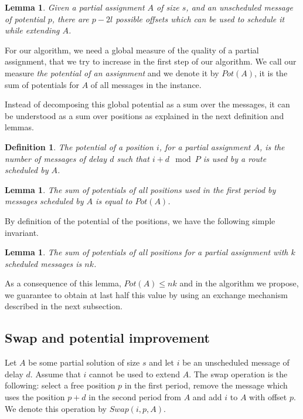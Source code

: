 \documentclass[10pt, conference, letterpaper]{IEEEtran}
\newtheorem{lemma}[theorem]{Lemma}
\newtheorem{definition}{Definition}
\begin{document}
\begin{lemma}
Given a partial assignment $A$ of size $s$, and an unscheduled message of potential 
$p$, there are $p - 2l$ possible offsets which can be used to schedule it while extending $A$.
\end{lemma}

For our algorithm, we need a global measure of the quality of a partial assignment, 
that we try to increase in the first step of our algorithm. 
We call our measure \emph{the potential of an assignment} and we denote it by $Pot(A)$, it is the sum of potentials for $A$ of all messages in the instance.

Instead of decomposing this global potential as a sum over the messages, it can be understood
as a sum over positions as explained in the next definition and lemmas.
 
\begin{definition}
The potential of a position $i$, for a partial assignment $A$, is the number of messages of delay $d$ such that $i+d \mod P$ is used by a route scheduled by $A$. 
\end{definition}

\begin{lemma}\label{lemma:pot_pos}
The sum of potentials of all positions used in the first period by messages scheduled by $A$ is equal to $Pot(A)$.  
\end{lemma}

By definition of the potential of the positions, we have the following simple invariant.

\begin{lemma}\label{lemma:inv}
The sum of potentials of all positions for a partial assignment with $k$ scheduled messages is $nk$.  
\end{lemma}

 As a consequence of this lemma, $Pot(A) \leq nk$ and in the algorithm we 
 propose, we guarantee to obtain at last half this value by using an exchange mechanism described in the next subsection.

\subsection{Swap and potential improvement}


Let $A$ be some partial solution of size $s$ and let $i$ be an unscheduled message of delay $d$. 
Assume that $i$ cannot be used to extend $A$. The swap operation is the following: 
select a free position $p$ in the first period, remove the message which uses the position $p+d$ in the second period from $A$ and add $i$ to $A$ with offset $p$. We denote this operation by $Swap(i,p,A)$.
\end{document}
